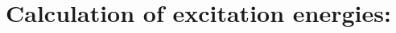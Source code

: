 
\section{Calculation of excitation energies: }\label{sec:ccexci}

\begin{description}
\item[] 
%
\item[] 
%
\item[] 
%
\item[] 
%
\item[] 
%
\item[] 
%
\item[] 
%
\item[] 
%
\item[] 
%
\item[] 
%
\item[] 
%
\item[] 
%
\item[] 
%
\end{description}
